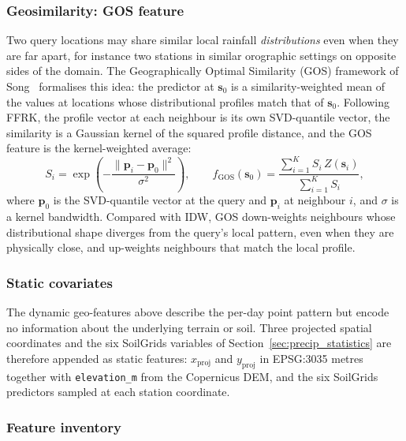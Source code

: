\subsubsection*{Geosimilarity: GOS feature}
\label{sec:lgbm-gos}

Two query locations may share similar local rainfall
\emph{distributions} even when they are far apart, for instance two
stations in similar orographic settings on opposite sides of the
domain. The Geographically Optimal Similarity (GOS) framework of
Song~\cite{song2022gos} formalises this idea: the predictor at
$\mathbf{s}_0$ is a similarity-weighted mean of the values at
locations whose distributional profiles match that of $\mathbf{s}_0$.
Following FFRK, the profile vector at each neighbour is its own
SVD-quantile vector, the similarity is a Gaussian kernel of the
squared profile distance, and the GOS feature is the kernel-weighted
average:
\begin{equation}
  S_i =
    \exp\!\left(
      -\frac{
        \|\mathbf{p}_i - \mathbf{p}_0\|^{2}
      }{
        \sigma^{2}
      }
    \right),
  \qquad
  f_{\mathrm{GOS}}(\mathbf{s}_0)
    = \frac{\sum_{i=1}^{K} S_i\, Z(\mathbf{s}_i)}{\sum_{i=1}^{K} S_i},
  \label{eq:lgbm-gos}
\end{equation}
where $\mathbf{p}_0$ is the SVD-quantile vector at the query and
$\mathbf{p}_i$ at neighbour $i$, and $\sigma$ is a kernel bandwidth.
Compared with IDW, GOS down-weights neighbours whose distributional
shape diverges from the query's local pattern, even when they are
physically close, and up-weights neighbours that match the local
profile.

\subsubsection*{Static covariates}
\label{sec:lgbm-static}

The dynamic geo-features above describe the per-day point pattern but
encode no information about the underlying terrain or soil. Three
projected spatial coordinates and the six SoilGrids variables of
Section~\ref{sec:precip_statistics} are therefore appended as static
features: $x_{\mathrm{proj}}$ and $y_{\mathrm{proj}}$ in EPSG:3035
metres together with \texttt{elevation\_m} from the Copernicus DEM,
and the six SoilGrids predictors sampled at each station coordinate.

\subsubsection*{Feature inventory}
\label{sec:lgbm-feature-inventory}

